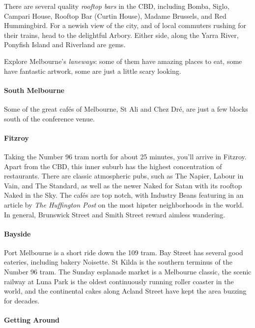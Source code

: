 There are several quality \emph{rooftop bars} in the CBD,
including Bomba, Siglo, Campari
House, Rooftop Bar (Curtin House), Madame Brussels, and Red Hummingbird.
For a newish view of the city, and of local commuters rushing for
their trains, head to the delightful Arbory. Either side, along the 
Yarra River, Ponyfish Island and Riverland are gems.

Explore Melbourne's {\em laneways}: some of them have amazing places to 
eat,
some have fantastic artwork, some are just a little scary looking.

\paragraph{South Melbourne}

Some of the great caf{\'e}s of Melbourne, St Ali and Chez Dr{\'e},
are just a few blocks south of the conference venue.

\paragraph{Fitzroy}

Taking the Number 96 tram north for about 25 minutes, you'll arrive in
Fitzroy.
Apart from the CBD, this inner suburb has the highest concentration of
restaurants.
There are classic atmospheric pubs, such as The Napier, Labour in
Vain, and The Standard, as well as the newer Naked for Satan with its 
rooftop
Naked in the Sky.
The caf{\'e}s are top notch, with Industry Beans
featuring in an article by {\em The Huffington Post} on the most hipster
neighborhoods in the world.
In general, Brunswick Street and Smith Street reward aimless wandering.

 

\paragraph{Bayside}

Port Melbourne is a short ride down the 109 tram. Bay Street has several good
eateries, including bakery Noisette.
St Kilda is the southern terminus of the Number 96 tram. The Sunday 
esplanade
market is a Melbourne classic, the scenic railway at Luna Park is the 
oldest
continuously running roller coaster in the world, and the continental 
cakes
along Acland Street have kept the area buzzing for decades.


\paragraph{Getting Around}

